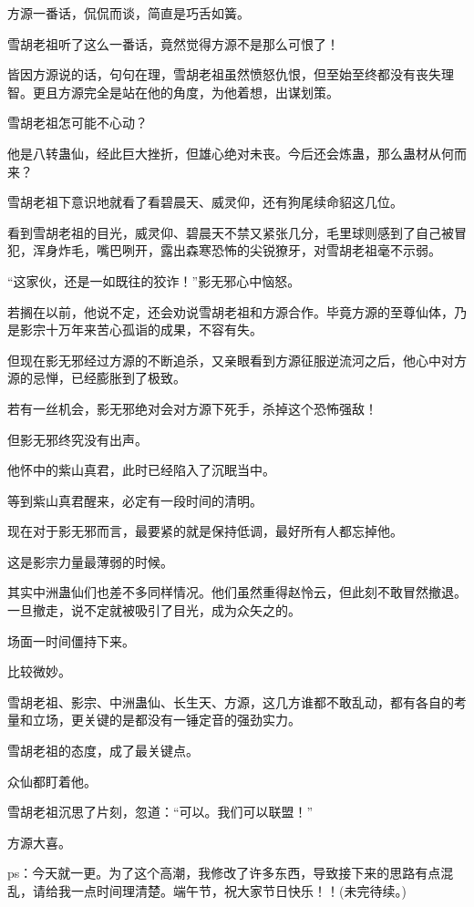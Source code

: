 \begin{this_body}
方源一番话，侃侃而谈，简直是巧舌如簧。

雪胡老祖听了这么一番话，竟然觉得方源不是那么可恨了！

皆因方源说的话，句句在理，雪胡老祖虽然愤怒仇恨，但至始至终都没有丧失理智。更且方源完全是站在他的角度，为他着想，出谋划策。

雪胡老祖怎可能不心动？

他是八转蛊仙，经此巨大挫折，但雄心绝对未丧。今后还会炼蛊，那么蛊材从何而来？

雪胡老祖下意识地就看了看碧晨天、威灵仰，还有狗尾续命貂这几位。

看到雪胡老祖的目光，威灵仰、碧晨天不禁又紧张几分，毛里球则感到了自己被冒犯，浑身炸毛，嘴巴咧开，露出森寒恐怖的尖锐獠牙，对雪胡老祖毫不示弱。

“这家伙，还是一如既往的狡诈！”影无邪心中恼怒。

若搁在以前，他说不定，还会劝说雪胡老祖和方源合作。毕竟方源的至尊仙体，乃是影宗十万年来苦心孤诣的成果，不容有失。

但现在影无邪经过方源的不断追杀，又亲眼看到方源征服逆流河之后，他心中对方源的忌惮，已经膨胀到了极致。

若有一丝机会，影无邪绝对会对方源下死手，杀掉这个恐怖强敌！

但影无邪终究没有出声。

他怀中的紫山真君，此时已经陷入了沉眠当中。

等到紫山真君醒来，必定有一段时间的清明。

现在对于影无邪而言，最要紧的就是保持低调，最好所有人都忘掉他。

这是影宗力量最薄弱的时候。

其实中洲蛊仙们也差不多同样情况。他们虽然重得赵怜云，但此刻不敢冒然撤退。一旦撤走，说不定就被吸引了目光，成为众矢之的。

场面一时间僵持下来。

比较微妙。

雪胡老祖、影宗、中洲蛊仙、长生天、方源，这几方谁都不敢乱动，都有各自的考量和立场，更关键的是都没有一锤定音的强劲实力。

雪胡老祖的态度，成了最关键点。

众仙都盯着他。

雪胡老祖沉思了片刻，忽道：“可以。我们可以联盟！”

方源大喜。

ps：今天就一更。为了这个高潮，我修改了许多东西，导致接下来的思路有点混乱，请给我一点时间理清楚。端午节，祝大家节日快乐！！(未完待续。)

\end{this_body}

